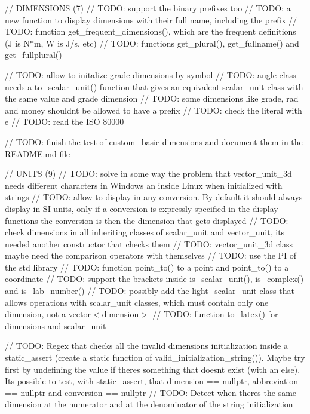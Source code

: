 // DIMENSIONS (7) // TODO\+: support the binary prefixes too // TODO\+: a new function to display dimensions with their full name, including the prefix // TODO\+: function get\+\_\+frequent\+\_\+dimensions(), which are the frequent definitions (J is N$\ast$m, W is J/s, etc) // TODO\+: functions get\+\_\+plural(), get\+\_\+fullname() and get\+\_\+fullplural()

// TODO\+: allow to initalize grade dimensions by symbol // TODO\+: angle class needs a to\+\_\+scalar\+\_\+unit() function that gives an equivalent scalar\+\_\+unit class with the same value and grade dimension // TODO\+: some dimensions like grade, rad and money shouldn\textquotesingle{}t be allowed to have a prefix // TODO\+: check the literal with e // TODO\+: read the ISO 80000

// TODO\+: finish the test of custom\+\_\+basic dimensions and document them in the \mbox{\hyperlink{README_8md}{README.\+md}} file

// UNITS (9) // TODO\+: solve in some way the problem that vector\+\_\+unit\+\_\+3d needs different characters in Windows an inside Linux when initialized with strings // TODO\+: allow to display in any conversion. By default it should always display in SI units, only if a conversion is expressly specified in the display functions the conversion is then the dimension that gets displayed // TODO\+: check dimensions in all inheriting classes of scalar\+\_\+unit and vector\+\_\+unit, it\textquotesingle{}s needed another constructor that checks them // TODO\+: vector\+\_\+unit\+\_\+3d class maybe need the comparison operators with themselves // TODO\+: use the PI of the std library // TODO\+: function point\+\_\+to() to a point and point\+\_\+to() to a coordinate // TODO\+: support the brackets inside \mbox{\hyperlink{namespacescifir_a35eaaedc7d36d386d328c0422e08863e}{is\+\_\+scalar\+\_\+unit()}}, \mbox{\hyperlink{namespacescifir_aa28fb8e3c6aa92108db7faac70b47f61}{is\+\_\+complex()}} and \mbox{\hyperlink{namespacescifir_a6f938e487f453f713e335dd6f884a413}{is\+\_\+lab\+\_\+number()}} // TODO\+: possibly add the light\+\_\+scalar\+\_\+unit class that allows operations with scalar\+\_\+unit classes, which must contain only one dimension, not a vector$<$dimension$>$ // TODO\+: function to\+\_\+latex() for dimensions and scalar\+\_\+unit

// TODO\+: Regex that checks all the invalid dimensions initialization inside a static\+\_\+assert (create a static function of valid\+\_\+initialization\+\_\+string()). Maybe try first by undefining the value if there\textquotesingle{}s something that doesn\textquotesingle{}t exist (with an else). It\textquotesingle{}s possible to test, with static\+\_\+assert, that dimension == nullptr, abbreviation == nullptr and conversion == nullptr // TODO\+: Detect when there\textquotesingle{}s the same dimension at the numerator and at the denominator of the string initialization

